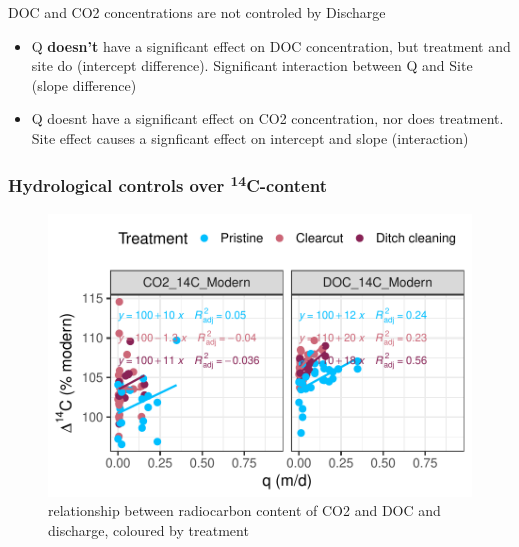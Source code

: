 \documentclass[
]{article}
\begin{document}
\begin{tcolorbox}[enhanced jigsaw, coltitle=black, opacitybacktitle=0.6, left=2mm, bottomtitle=1mm, colback=white, toprule=.15mm, arc=.35mm, toptitle=1mm, leftrule=.75mm, rightrule=.15mm, colbacktitle=quarto-callout-note-color!10!white, breakable, titlerule=0mm, bottomrule=.15mm, colframe=quarto-callout-note-color-frame, title=\textcolor{quarto-callout-note-color}{\faInfo}\hspace{0.5em}{Interpretation}, opacityback=0]

DOC and CO2 concentrations are not controled by Discharge

\begin{itemize}
\item
  Q \textbf{doesn't} have a significant effect on DOC concentration, but
  treatment and site do (intercept difference). Significant interaction
  between Q and Site (slope difference)
\item
  Q doesnt have a significant effect on CO2 concentration, nor does
  treatment. Site effect causes a signficant effect on intercept and
  slope (interaction)
\end{itemize}

\end{tcolorbox}

\subsubsection{\texorpdfstring{Hydrological controls over
\textsuperscript{14}C-content}{Hydrological controls over 14C-content}}\label{hydrological-controls-over-14c-content}

\begin{figure}[H]

{\centering \includegraphics{index_files/figure-pdf/unnamed-chunk-12-1.pdf}

}

\caption{relationship between radiocarbon content of CO2 and DOC and
discharge, coloured by treatment}

\end{figure}%
\end{document}

